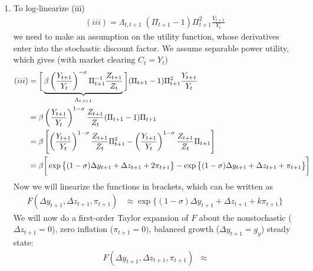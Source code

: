 \documentclass[12pt]{article}
\theoremstyle{plain}
\theoremstyle{definition}
\theoremstyle{remark}
\begin{document}
\begin{enumerate}[label=(\roman*)]
      \item
        To log-linearize (iii)
        \begin{align*}
          (iii)
          =
          \Lambda_{t,t+1}\;
          (\Pi_{t+1}-1)\Pi^2_{t+1}\frac{Y_{t+1}}{Y_t}
        \end{align*}
        we need to make an assumption on the utility function, whose
        derivatives enter into the stochastic discount factor. We assume
        separable power utility, which gives (with market clearing
        $C_t=Y_t$)
        \begin{align*}
          (iii)
          &=
          \bigg[
          \underbrace{%
          \beta\left(\frac{Y_{t+1}}{Y_t}\right)^{-\sigma}
          \Pi_{t+1}^{-1}
          \frac{Z_{t+1}}{Z_t}
          }_{\Lambda_{t,t+1}}
          \bigg]
          (\Pi_{t+1}-1)\Pi^2_{t+1}\frac{Y_{t+1}}{Y_t}
          \\
          &=
          \beta\left(\frac{Y_{t+1}}{Y_t}\right)^{1-\sigma}
          \frac{Z_{t+1}}{Z_t}
          (\Pi_{t+1}-1)\Pi_{t+1} \\
          &=
          \beta
          \left[
          \left(\frac{Y_{t+1}}{Y_t}\right)^{1-\sigma}
          \frac{Z_{t+1}}{Z_t}
          \Pi_{t+1}^2
          -
          \left(\frac{Y_{t+1}}{Y_t}\right)^{1-\sigma}
          \frac{Z_{t+1}}{Z_t}
          \Pi_{t+1}
          \right]
          \\
          &=
          \beta
          \bigg[
          \exp\big\{
          (1-\sigma)\Delta y_{t+1}
          + \Delta z_{t+1}
          + 2\pi_{t+1}
          \big\}
          -
          \exp\big\{
          (1-\sigma)\Delta y_{t+1}
          + \Delta z_{t+1}
          + \pi_{t+1}
          \big\}
          \bigg]
        \end{align*}
        Now we will linearize the functions in brackets, which can be
        written as
        \begin{align*}
          F(\Delta y_{t+1}, \Delta z_{t+1}, \pi_{t+1})
          &\approx
          \exp\big\{
          (1-\sigma)\Delta y_{t+1}
          + \Delta z_{t+1}
          + k\pi_{t+1}
          \big\}
        \end{align*}
        We will now do a first-order Taylor expansion of $F$ about the
        nonstochastic ($\Delta z_{t+1}=0$), zero inflation
        ($\pi_{t+1}=0)$, balanced growth ($\Delta y_{t+1}=g_y$) steady
        state:
        \begin{align*}
          F(\Delta y_{t+1}, \Delta z_{t+1}, \pi_{t+1})
          &\approx

\end{align*}
\end{enumerate}
\end{document}
